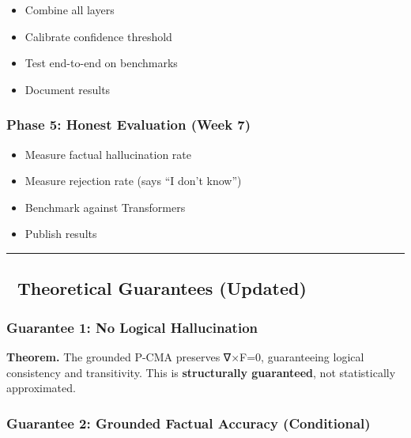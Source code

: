 \documentclass[
  11pt,
  a4paper,
]{article}
\providecommand{\tightlist}{%
  \setlength{\itemsep}{0pt}\setlength{\parskip}{0pt}}
\begin{document}
\begin{itemize}
\tightlist
\item[$\square$]
  Combine all layers
\item[$\square$]
  Calibrate confidence threshold
\item[$\square$]
  Test end-to-end on benchmarks
\item[$\square$]
  Document results
\end{itemize}

\subsubsection{Phase 5: Honest Evaluation (Week
7)}\label{phase-5-honest-evaluation-week-7}

\begin{itemize}
\tightlist
\item[$\square$]
  Measure factual hallucination rate
\item[$\square$]
  Measure rejection rate (says ``I don't know'')
\item[$\square$]
  Benchmark against Transformers
\item[$\square$]
  Publish results
\end{itemize}

\begin{center}\rule{0.5\linewidth}{0.5pt}\end{center}

\subsection{🔬 Theoretical Guarantees
(Updated)}\label{theoretical-guarantees-updated}

\subsubsection{Guarantee 1: No Logical
Hallucination}\label{guarantee-1-no-logical-hallucination}

\textbf{Theorem.} The grounded P-CMA preserves ∇×F=0, guaranteeing
logical consistency and transitivity. This is \textbf{structurally
guaranteed}, not statistically approximated.

\subsubsection{Guarantee 2: Grounded Factual Accuracy
(Conditional)}\label{guarantee-2-grounded-factual-accuracy-conditional}
\end{document}
